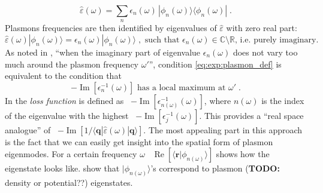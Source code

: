 \documentclass[a4paper,12pt]{article}
\begin{document}
    \begin{equation*}
        \hat\varepsilon(\omega) = \sum_n \epsilon_n(\omega) \, |\phi_n(\omega)\rangle\!\langle \phi_n(\omega)|\; .
    \end{equation*}
    Plasmons frequencies are then identified by eigenvalues of $\hat\varepsilon$ with zero real part:
    \begin{equation} \label{eq:exp:plasmon_def}
        \hat\varepsilon(\omega)|\phi_n(\omega)\rangle = \epsilon_n(\omega) |\phi_n(\omega)\rangle\;,\text{ such that }\epsilon_n(\omega) \in \mathbb{C}\setminus\mathbb{R}\text{, i.e. purely imaginary.}
    \end{equation}
    As noted in \cite{andersen2012spatially}, ``when the imaginary part of eigenvalue $\epsilon_n(\omega)$ does not vary too much around the plasmon frequency $\omega'$'', condition \eqref{eq:exp:plasmon_def} is equivalent to the condition that
    \begin{equation} \label{eq:exp:plasmon_qm_condition}
        -\operatorname{Im}[\epsilon_n^{-1}(\omega)] \text{ has a local maximum at }\omega'\;.
    \end{equation}
    In \cite{plasmonic2015} the \textit{loss function} is defined as \ $-\operatorname{Im}[\epsilon_{n(\omega)}^{-1}(\omega)]$, where $n(\omega)$ is the index of the eigenvalue with the highest \ $-\operatorname{Im}[ \epsilon_j^{-1}(\omega)]$. This provides a ``real space analogue'' of \ $-\operatorname{Im}\left[1/\langle\mathbf{q}| \hat\varepsilon(\omega) |\mathbf{q}\rangle\right]$. 
    The most appealing part in this approach is the fact that we can easily get insight into the spatial form of plasmon eigenmodes. For a certain frequency $\omega$ \ $\operatorname{Re}[\langle\mathbf{r}|\phi_{n(\omega)}\rangle]$ shows how the eigenstate looks like. \cite{andersen2012spatially} show that $|\phi_{n(\omega)}\rangle$'s correspond to plasmon (\textbf{TODO:} density or potential??) eigenstates.

\end{document}

